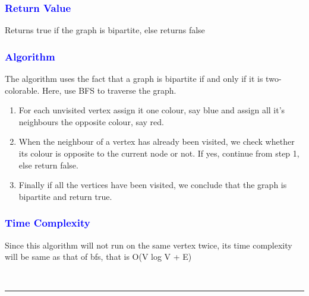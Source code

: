 \documentclass[11pt,a4paper]{article}
\begin{document}
\subsubsection*{\textcolor{blue}{ \large {Return Value}}}
Returns true if the graph is bipartite, else returns false
\subsubsection*{\textcolor{blue}{ \large {Algorithm}}}
The algorithm uses the fact that a graph is bipartite if and only if it is two-colorable. Here, use BFS to traverse the graph.
\begin{enumerate}  
\item For each unvisited vertex assign it one colour, say blue and assign all it’s neighbours the opposite colour, say red.
\item When the neighbour of a vertex has already been visited, we check whether its colour is opposite to the current node or not. If yes, continue from step 1, else return false.
\item Finally if all the vertices have been visited, we conclude that the graph is bipartite and return true.
 

\end{enumerate}  

\subsubsection*{\textcolor{blue}{ \large {Time Complexity}}}
Since this algorithm will not run on the same vertex twice, its time complexity will be same as that of bfs, that is O(V log V + E)

\\
\rule{17cm}{0.1mm}
\end{document}
